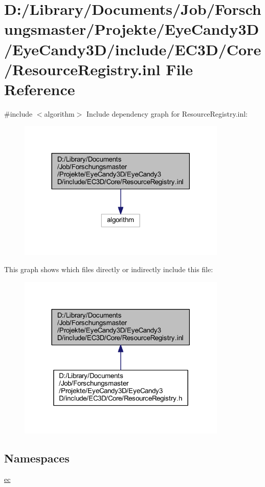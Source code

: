\hypertarget{_resource_registry_8inl}{}\section{D\+:/\+Library/\+Documents/\+Job/\+Forschungsmaster/\+Projekte/\+Eye\+Candy3\+D/\+Eye\+Candy3\+D/include/\+E\+C3\+D/\+Core/\+Resource\+Registry.inl File Reference}
\label{_resource_registry_8inl}
{\ttfamily \#include $<$algorithm$>$}\newline
Include dependency graph for Resource\+Registry.\+inl\+:\nopagebreak
\begin{figure}[H]
\begin{center}
\leavevmode
\includegraphics[width=282pt]{_resource_registry_8inl__incl}
\end{center}
\end{figure}
This graph shows which files directly or indirectly include this file\+:\nopagebreak
\begin{figure}[H]
\begin{center}
\leavevmode
\includegraphics[width=282pt]{_resource_registry_8inl__dep__incl}
\end{center}
\end{figure}
\subsection*{Namespaces}
\begin{DoxyCompactItemize}
\item 
 \mbox{\hyperlink{namespaceec}{ec}}
\end{DoxyCompactItemize}
